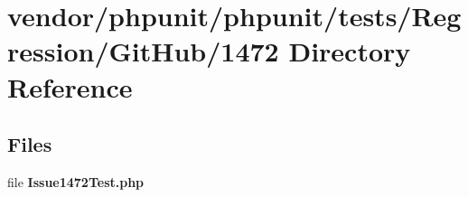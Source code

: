 \section{vendor/phpunit/phpunit/tests/\+Regression/\+Git\+Hub/1472 Directory Reference}
\label{dir_9eefe66a2132b08c010eb9664d481a7e}
\subsection*{Files}
\begin{DoxyCompactItemize}
\item 
file {\bf Issue1472\+Test.\+php}
\end{DoxyCompactItemize}
